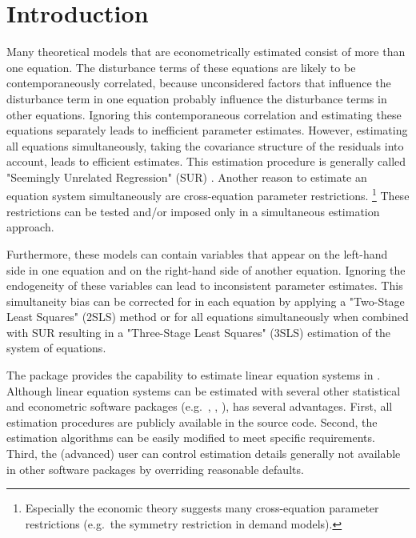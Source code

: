 


\section{Introduction}

Many theoretical models that are econometrically estimated
consist of more than one equation.
The disturbance terms of these equations are likely
to be contemporaneously correlated,
because unconsidered factors
that influence the disturbance term in one equation
probably influence the disturbance terms in other equations.
Ignoring this contemporaneous correlation
and estimating these equations separately
leads to inefficient parameter estimates.
However, estimating all equations simultaneously,
taking the covariance structure of the residuals into account,
leads to efficient estimates.
This estimation procedure is generally called
"Seemingly Unrelated Regression" (SUR) \citep{zellner62}.
Another reason to estimate an equation system simultaneously are
cross-equation parameter restrictions.%
\footnote{
Especially the economic theory suggests many cross-equation parameter
restrictions (e.g.\ the symmetry restriction in demand models).
}
These restrictions can be tested and/or imposed only in a simultaneous
estimation approach.

Furthermore, these models can contain variables
that appear on the left-hand side in one equation
and on the right-hand side of another equation.
Ignoring the endogeneity of these variables can lead to inconsistent
parameter estimates.
This simultaneity bias can be corrected for in each equation by
applying a "Two-Stage Least Squares" (2SLS) method or for all
equations simultaneously when combined with SUR resulting in a
"Three-Stage Least Squares" (3SLS) estimation of the system of
equations.



The  package provides the capability to estimate
linear equation systems in 
\citep{r-project}.
Although linear equation systems can be estimated
with several other statistical and econometric software packages
(e.g.\ , , ),
 has several advantages.
First, all estimation procedures are publicly available in the source code.
Second, the estimation algorithms can be easily modified to meet specific
requirements.
Third, the (advanced) user can control estimation details generally
not available in other software packages by overriding reasonable defaults.

